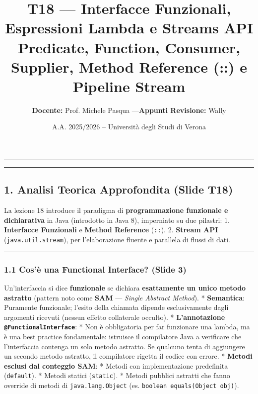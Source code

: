 \documentclass[11pt,a4paper]{article}
\title{\Huge\bfseries\sffamily\color{brandblue} T18 --- Interfacce Funzionali, Espressioni Lambda e Streams API \\[0.3em] \large\sffamily Predicate, Function, Consumer, Supplier, Method Reference (::) e Pipeline Stream}
\author{\textbf{Docente:} Prof. Michele Pasqua \quad---\quad \textbf{Appunti Revisione:} Wally}
\date{A.A. 2025/2026 -- Universit\`a degli Studi di Verona}
\newcommand{\passthrough}[1]{#1}
\begin{document}
\maketitle
\thispagestyle{fancy}
\vspace{-1.2em}
\noindent\textcolor{brandblue}{\rule{\textwidth}{0.8pt}}
\vspace{1.2em}

\begin{center}\rule{0.5\linewidth}{0.5pt}\end{center}

\subsection{1. Analisi Teorica Approfondita (Slide
T18)}\label{analisi-teorica-approfondita-slide-t18}

La lezione 18 introduce il paradigma di \textbf{programmazione
funzionale e dichiarativa} in Java (introdotto in Java 8), imperniato su
due pilastri: 1. \textbf{Interfacce Funzionali} e \textbf{Method
Reference} (\passthrough{\lstinline!::!}). 2. \textbf{Stream API}
(\passthrough{\lstinline!java.util.stream!}), per l'elaborazione fluente
e parallela di flussi di dati.

\begin{center}\rule{0.5\linewidth}{0.5pt}\end{center}

\subsubsection{1.1 Cos'è una Functional Interface? (Slide
3)}\label{cosuxe8-una-functional-interface-slide-3}

Un'interfaccia si dice \textbf{funzionale} se dichiara
\textbf{esattamente un unico metodo astratto} (pattern noto come
\textbf{SAM} --- \emph{Single Abstract Method}). * \textbf{Semantica}:
Puramente funzionale; l'esito della chiamata dipende esclusivamente
dagli argomenti ricevuti (nessun effetto collaterale occulto). *
\textbf{L'annotazione \passthrough{\lstinline!@FunctionalInterface!}}: *
Non è obbligatoria per far funzionare una lambda, ma è una best practice
fondamentale: istruisce il compilatore Java a verificare che
l'interfaccia contenga un solo metodo astratto. Se qualcuno tenta di
aggiungere un secondo metodo astratto, il compilatore rigetta il codice
con errore. * \textbf{Metodi esclusi dal conteggio SAM}: * Metodi con
implementazione predefinita (\passthrough{\lstinline!default!}). *
Metodi statici (\passthrough{\lstinline!static!}). * Metodi pubblici
astratti che fanno override di metodi di
\passthrough{\lstinline!java.lang.Object!} (es.
\passthrough{\lstinline!boolean equals(Object obj)!}).
\end{document}
